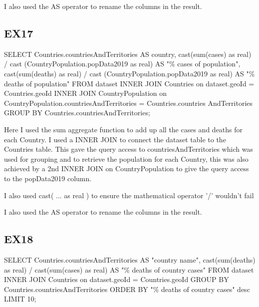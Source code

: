 \documentclass{report}
\begin{document}
	I also used the AS operator to rename the columns in the result.
	
	
	
	\subsection{EX17}
	SELECT Countries.countriesAndTerritories AS country,\newline
	cast(sum(cases) as real) / cast (CountryPopulation.popData2019 as real) AS "\% cases of population", \newline
	cast(sum(deaths) as real) / cast (CountryPopulation.popData2019 as real) AS "\% deaths of population"\newline
	FROM dataset \newline
	INNER JOIN Countries on dataset.geoId = Countries.geoId \newline
	INNER JOIN CountryPopulation on CountryPopulation.countriesAndTerritories = Countries.countries AndTerritories \newline
	GROUP BY Countries.countriesAndTerritories;\newline
	
	
	Here I used the sum aggregate function to add up all the cases and deaths for each Country. I used a INNER JOIN to connect the dataset table to the Countries table. This gave the query access to countriesAndTerritories which was used for grouping and to retrieve the population for each Country, this was also achieved by a 2nd INNER JOIN on CountryPopulation to give the query access to the popData2019 column.\newline
	
	I also used cast( ... as real ) to ensure the mathematical operator '/' wouldn't fail\newline
	
	I also used the AS operator to rename the columns in the result.
	
	
	
	
	\subsection{EX18}
	SELECT Countries.countriesAndTerritories AS "country name", \newline
	cast(sum(deaths) as real) / cast(sum(cases) as real) AS "\% deaths of country cases" \newline
	FROM dataset \newline
	INNER JOIN Countries on dataset.geoId = Countries.geoId \newline
	GROUP BY Countries.countriesAndTerritories  \newline
	ORDER BY "\% deaths of country cases" desc \newline
	LIMIT 10; \newline
	
\end{document}
